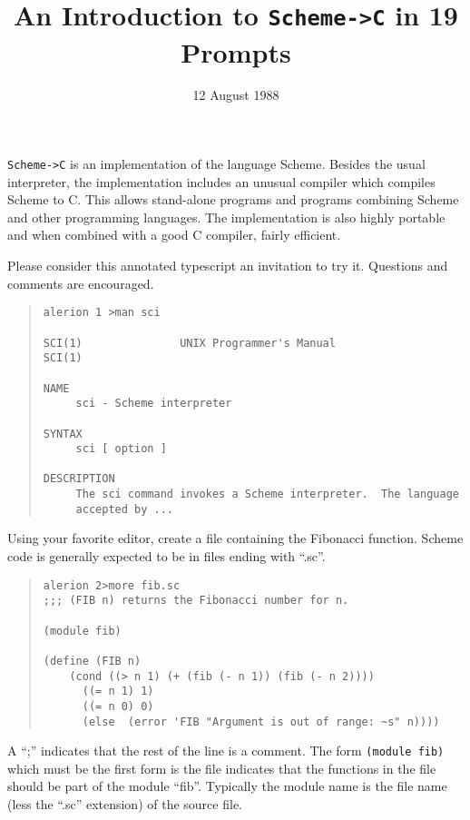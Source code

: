 \documentclass[11pt]{article}
\title{An Introduction to \texttt{Scheme->C} in 19 Prompts}
\date{12 August 1988}
\begin{document}
\maketitle

\texttt{Scheme->C} is an implementation of the language Scheme.  Besides
the usual interpreter, the implementation includes an unusual
compiler which compiles Scheme to C.  This allows stand-alone
programs and programs combining Scheme and other programming
languages.  The implementation is also highly portable and when
combined with a good C compiler, fairly efficient.

Please consider this annotated typescript an invitation to try it.
Questions and comments are encouraged.

\begin{small}
\begin{quote}
\begin{verbatim}
alerion 1 >man sci

SCI(1)               UNIX Programmer's Manual                SCI(1)

NAME
     sci - Scheme interpreter

SYNTAX
     sci [ option ]

DESCRIPTION
     The sci command invokes a Scheme interpreter.  The language
     accepted by ...
\end{verbatim}
\end{quote}
\end{small}

Using your favorite editor, create a file containing the Fibonacci
function.  Scheme code is generally expected to be in files ending
with ``.sc''.

\begin{small}
\begin{quote}
\begin{verbatim}
alerion 2>more fib.sc
;;; (FIB n) returns the Fibonacci number for n.

(module fib)

(define (FIB n)
    (cond ((> n 1) (+ (fib (- n 1)) (fib (- n 2))))
	  ((= n 1) 1)
	  ((= n 0) 0)
	  (else  (error 'FIB "Argument is out of range: ~s" n))))
\end{verbatim}
\end{quote}
\end{small}

A ``;'' indicates that the rest of the line is a comment.  The form
\texttt{(module fib)} which must be the first form is the file indicates
that the functions in the file should be part of the module ``fib''.
Typically the module name is the file name (less the ``.sc'' extension)
of the source file.
\end{document}
